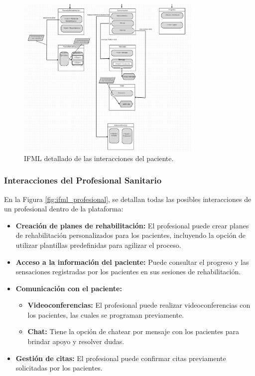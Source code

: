 \documentclass{article}
\begin{document}
\begin{figure}[H]
	\centering
	\includegraphics[width=0.8\textwidth]{images/ifml_paciente.png}
	\caption{IFML detallado de las interacciones del paciente.}
	\label{fig:ifml_paciente}
\end{figure}
\newpage
\subsubsection{Interacciones del Profesional Sanitario}

En la Figura \ref{fig:ifml_profesional}, se detallan todas las posibles interacciones de un profesional dentro de la plataforma:

\begin{itemize}
	\item \textbf{Creación de planes de rehabilitación:} El profesional puede crear planes de rehabilitación personalizados para los pacientes, incluyendo la opción de utilizar plantillas predefinidas para agilizar el proceso.
	\item \textbf{Acceso a la información del paciente:} Puede consultar el progreso y las sensaciones registradas por los pacientes en sus sesiones de rehabilitación.
	\item \textbf{Comunicación con el paciente:} 
	\begin{itemize}
		\item \textbf{Videoconferencias:} El profesional puede realizar videoconferencias con los pacientes, las cuales se programan previamente.
		\item \textbf{Chat:} Tiene la opción de chatear por mensaje con los pacientes para brindar apoyo y resolver dudas.
	\end{itemize}
	\item \textbf{Gestión de citas:} El profesional puede confirmar citas previamente solicitadas por los pacientes.
\end{itemize}
\end{document}
